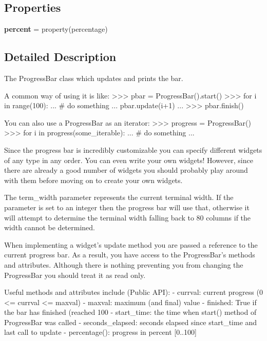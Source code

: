 \subsection*{Properties}
\begin{DoxyCompactItemize}
\item 
{\bfseries percent} = property(percentage)\hypertarget{class_libraries_1_1_fast_progress_bar_1_1_progress_bar_a7dd129bb1d5a2316ecf86e833155008e}{}\label{class_libraries_1_1_fast_progress_bar_1_1_progress_bar_a7dd129bb1d5a2316ecf86e833155008e}

\end{DoxyCompactItemize}


\subsection{Detailed Description}
\begin{DoxyVerb}The ProgressBar class which updates and prints the bar.

A common way of using it is like:
>>> pbar = ProgressBar().start()
>>> for i in range(100):
...    # do something
...    pbar.update(i+1)
...
>>> pbar.finish()

You can also use a ProgressBar as an iterator:
>>> progress = ProgressBar()
>>> for i in progress(some_iterable):
...    # do something
...

Since the progress bar is incredibly customizable you can specify
different widgets of any type in any order. You can even write your own
widgets! However, since there are already a good number of widgets you
should probably play around with them before moving on to create your own
widgets.

The term_width parameter represents the current terminal width. If the
parameter is set to an integer then the progress bar will use that,
otherwise it will attempt to determine the terminal width falling back to
80 columns if the width cannot be determined.

When implementing a widget's update method you are passed a reference to
the current progress bar. As a result, you have access to the
ProgressBar's methods and attributes. Although there is nothing preventing
you from changing the ProgressBar you should treat it as read only.

Useful methods and attributes include (Public API):
 - currval: current progress (0 <= currval <= maxval)
 - maxval: maximum (and final) value
 - finished: True if the bar has finished (reached 100%
 - start_time: the time when start() method of ProgressBar was called
 - seconds_elapsed: seconds elapsed since start_time and last call to
                    update
 - percentage(): progress in percent [0..100]
\end{DoxyVerb}
 

